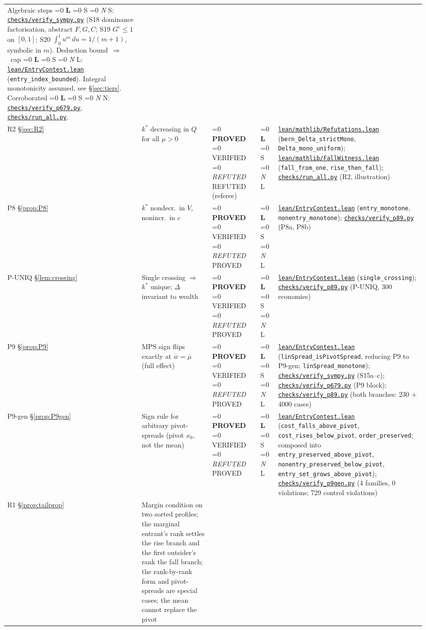 \documentclass[11pt]{article}
\newcommand{\file}[1]{\href{run:#1}{\texttt{#1}}}
\newcommand{\status}[1]{%
  \ifnum\pdfstrcmp{#1}{PROVED}=0 \textbf{PROVED}%
  \else\ifnum\pdfstrcmp{#1}{VERIFIED}=0 VERIFIED%
  \else\ifnum\pdfstrcmp{#1}{REFUTED}=0 \emph{REFUTED}%
  \else #1\fi\fi\fi}
\newcommand{\tier}[1]{%
  \ifnum\pdfstrcmp{#1}{L}=0 \textbf{L}%
  \else\ifnum\pdfstrcmp{#1}{S}=0 S%
  \else\ifnum\pdfstrcmp{#1}{N}=0 \emph{N}%
  \else #1\fi\fi\fi}
\begin{document}
\begin{longtable}{@{}p{1.5cm}p{5.0cm}p{1.5cm}p{0.8cm}p{6.0cm}@{}}
  Algebraic steps \tier{S}: \file{checks/verify\_sympy.py} (S18 dominance factorisation, abstract $F,G,C$; S19 $G^{e}\le1$ on $[0,1]$; S20 $\int_0^1u^m\,du=1/(m{+}1)$, symbolic in $m$). Deduction bound~$\Rightarrow$~cap \tier{L}: \file{lean/EntryContest.lean} (\texttt{entry\_index\_bounded}). Integral monotonicity assumed, see \S\ref{sec:tiers}. Corroborated \tier{N}: \file{checks/verify\_p679.py}, \file{checks/run\_all.py}. \\[4pt]
R2 \S\ref{sec:R2} & $k^*$ decreasing in $Q$ for all $\mu>0$ &
  \status{REFUTED} (referee) & \tier{L} &
  \file{lean/mathlib/Refutations.lean} (\texttt{bern\_Delta\_strictMono}, \texttt{Delta\_mono\_uniform}); \file{lean/mathlib/FallWitness.lean} (\texttt{fall\_from\_one}, \texttt{rise\_then\_fall}); \file{checks/run\_all.py} (R2, illustration) \\[4pt]
P8 \S\ref{prop:P8} & $k^*$ nondecr.\ in $V$, nonincr.\ in $c$ &
  \status{PROVED} & \tier{L} &
  \file{lean/EntryContest.lean} (\texttt{entry\_monotone}, \texttt{nonentry\_monotone}); \file{checks/verify\_p89.py} (P8a, P8b) \\[4pt]
P-UNIQ \S\ref{lem:crossing} & Single crossing $\Rightarrow$ $k^*$ unique; $\Delta$ invariant to wealth &
  \status{PROVED} & \tier{L} &
  \file{lean/EntryContest.lean} (\texttt{single\_crossing}); \file{checks/verify\_p89.py} (P-UNIQ, 300 economies) \\[4pt]
P9 \S\ref{prop:P9} & MPS sign flips exactly at $\bar w=\bar\mu$ (full effect) &
  \status{PROVED} & \tier{L} &
  \file{lean/EntryContest.lean} (\texttt{linSpread\_isPivotSpread}, reducing P9 to P9-gen; \texttt{linSpread\_monotone}); \file{checks/verify\_sympy.py} (S15a--c); \file{checks/verify\_p679.py} (P9 block); \file{checks/verify\_p89.py} (both branches: 230 + 4000 cases) \\[4pt]
P9-gen \S\ref{prop:P9gen} & Sign rule for arbitrary pivot-spreads (pivot $x_0$, not the mean) &
  \status{PROVED} & \tier{L} &
  \file{lean/EntryContest.lean} (\texttt{cost\_falls\_above\_pivot}, \texttt{cost\_rises\_below\_pivot}, \texttt{order\_preserved}; composed into \texttt{entry\_preserved\_above\_pivot}, \texttt{nonentry\_preserved\_below\_pivot}, \texttt{entry\_set\_grows\_above\_pivot}); \file{checks/verify\_p9gen.py} (4 families, 0 violations; 729 control violations) \\[4pt]
R1 \S\ref{prop:tailprop} & Margin condition on two sorted profiles; the marginal entrant's rank settles the rise branch and the first outsider's rank the fall branch; the rank-by-rank form and pivot-spreads are special cases; the mean cannot replace the pivot &

\end{longtable}
\end{document}
